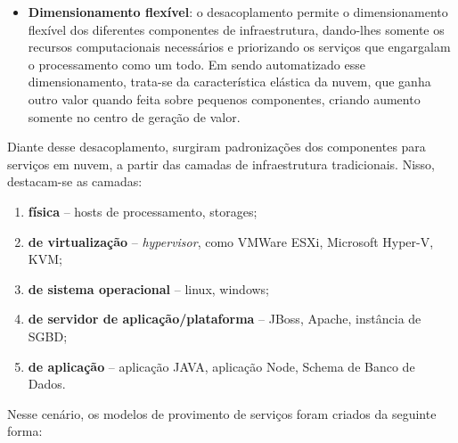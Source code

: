 \begin{itemize}
        \item \textbf{Dimensionamento flexível}: o desacoplamento permite o dimensionamento flexível dos diferentes componentes de infraestrutura, dando-lhes somente os recursos computacionais necessários e priorizando os serviços que engargalam o processamento como um todo. Em sendo automatizado esse dimensionamento, trata-se da característica elástica da nuvem, que ganha outro valor quando feita sobre pequenos componentes, criando aumento somente no centro de geração de valor.
    \end{itemize}
    
    Diante desse desacoplamento, surgiram padronizações dos componentes para serviços em nuvem, a partir das camadas de infraestrutura tradicionais. Nisso, destacam-se as camadas:
    
    \begin{enumerate}
        \item \label{layer:fisica} \textbf{física} -- hosts de processamento, storages;
        \item \label{layer:virt} \textbf{de virtualização} -- \emph{hypervisor}, como VMWare ESXi, Microsoft Hyper-V, KVM;
        \item \label{layer:so} \textbf{de sistema operacional} -- linux, windows;
        \item \label{layer:sa} \textbf{de servidor de aplicação/plataforma} -- JBoss, Apache, instância de SGBD;
        \item \label{layer:app} \textbf{de aplicação} -- aplicação JAVA, aplicação Node, Schema de Banco de Dados.
    \end{enumerate}
    
    Nesse cenário, os modelos de provimento de serviços foram criados da seguinte forma:
    
